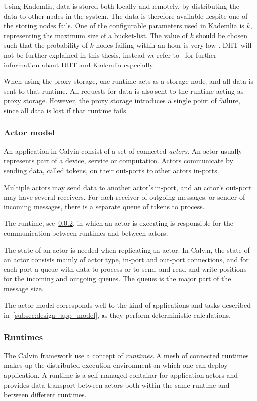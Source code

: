 \documentclass{cslthse-msc}
\begin{document}
Using Kademlia, data is stored both locally and remotely, by distributing the data to other nodes in the system. The data is therefore available despite one of the storing nodes fails. One of the configurable parameters used in Kademlia is $k$, representing the maximum size of a bucket-list. The value of $k$ should be chosen such that the probability of $k$ nodes failing within an hour is very low \cite{kademlia}. DHT will not be further explained in this thesis, instead we refer to~\cite{kademlia} for further information about DHT and Kademlia especially. 

When using the proxy storage, one runtime acts as a storage node, and all data is sent to that runtime. All requests for data is also sent to the runtime acting as proxy storage. However, the proxy storage introduces a single point of failure, since all data is lost if that runtime fails. %

\subsubsection{Actor model} \label{sec:calvin_actor}
An application in Calvin consist of a set of connected \emph{actors}. An actor usually represents part of a device, service or computation. Actors communicate by sending data, called tokens, on their out-ports to other actors in-ports. 

Multiple actors may send data to another actor's in-port, and an actor's out-port may have several receivers. For each receiver of outgoing messages, or sender of incoming messages, there is a separate queue of tokens to process.

The runtime, see~\cref{sec:calvin_runtime}, in which an actor is executing is responsible for the communication between runtimes and between actors.

The state of an actor is needed when replicating an actor. In Calvin, the state of an actor consists mainly of actor type, in-port and out-port connections, and for each port a queue with data to process or to send, and read and write positions for the incoming and outgoing queues. The queues is the major part of the message size.

The actor model corresponds well to the kind of applications and tasks described in~\cref{subsec:design_app_model}, as they perform deterministic calculations.

\subsubsection{Runtimes} \label{sec:calvin_runtime}
The Calvin framework use a concept of \emph{runtimes}. A mesh of connected runtimes makes up the distributed execution environment on which one can deploy application. A runtime is a self-managed container for application actors and provides data transport between actors both within the same runtime and between different runtimes.
\end{document}
